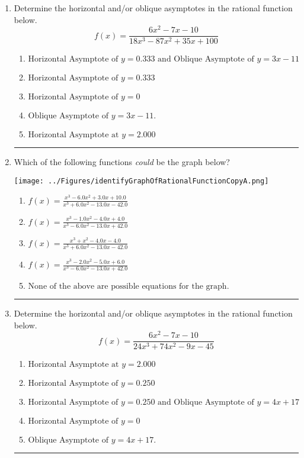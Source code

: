 \documentclass[14pt]{extbook}
\newcommand{\litem}[1]{\item#1\hspace*{-1cm}\rule{\textwidth}{0.4pt}}
\begin{document}
\begin{enumerate}
{\begin{enumerate}[label=\Alph*.]
\end{enumerate} }
\litem{
Determine the horizontal and/or oblique asymptotes in the rational function below.\[ f(x) = \frac{6x^{2} -7 x -10}{18x^{3} -87 x^{2} +35 x + 100} \]\begin{enumerate}[label=\Alph*.]
\item \( \text{Horizontal Asymptote of } y = 0.333 \text{ and Oblique Asymptote of } y = 3x -11 \)
\item \( \text{Horizontal Asymptote of } y = 0.333  \)
\item \( \text{Horizontal Asymptote of } y = 0 \)
\item \( \text{Oblique Asymptote of } y = 3x -11. \)
\item \( \text{Horizontal Asymptote at } y = 2.000 \)

\end{enumerate} }
\litem{
Which of the following functions \textit{could} be the graph below?
\begin{center}
    \texttt{[image: ../Figures/identifyGraphOfRationalFunctionCopyA.png]}
\end{center}
\begin{enumerate}[label=\Alph*.]
\item \( f(x)=\frac{x^{3} -6.0 x^{2} +3.0 x + 10.0}{x^{3} +6.0 x^{2} -13.0 x -42.0} \)
\item \( f(x)=\frac{x^{3} -1.0 x^{2} -4.0 x + 4.0}{x^{3} -6.0 x^{2} -13.0 x + 42.0} \)
\item \( f(x)=\frac{x^{3} + x^{2} -4.0 x -4.0}{x^{3} +6.0 x^{2} -13.0 x -42.0} \)
\item \( f(x)=\frac{x^{3} -2.0 x^{2} -5.0 x + 6.0}{x^{3} -6.0 x^{2} -13.0 x + 42.0} \)
\item \( \text{None of the above are possible equations for the graph.} \)

\end{enumerate} }
\litem{
Determine the horizontal and/or oblique asymptotes in the rational function below.\[ f(x) = \frac{6x^{2} -7 x -10}{24x^{3} +74 x^{2} -9 x -45} \]\begin{enumerate}[label=\Alph*.]
\item \( \text{Horizontal Asymptote at } y = 2.000 \)
\item \( \text{Horizontal Asymptote of } y = 0.250  \)
\item \( \text{Horizontal Asymptote of } y = 0.250 \text{ and Oblique Asymptote of } y = 4x + 17 \)
\item \( \text{Horizontal Asymptote of } y = 0 \)
\item \( \text{Oblique Asymptote of } y = 4x + 17. \)


\end{enumerate}}
\end{enumerate}
\end{document}
